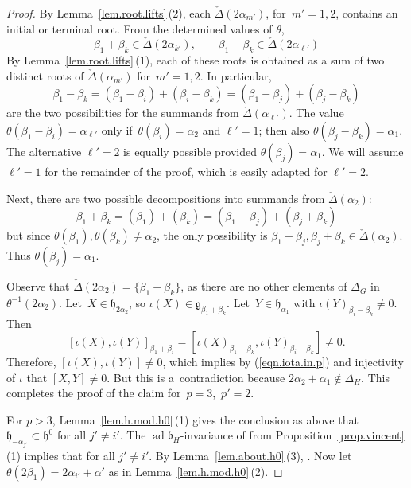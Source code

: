 \documentclass[pdftex]{sigma}
\numberwithin{equation}{section}
\theoremstyle{definition}
\newcommand{\lieg}{\mathfrak{g}}
\newcommand{\lieh}{\mathfrak{h}}
\def\b{{\mathfrak b}}
\newcommand{\ad}{\operatorname{ad}}
\begin{document}
\begin{proof}
By Lemma~\ref{lem.root.lifts}\,(2), each $\check{\Delta}(2 \alpha_{m'})$, for~${m'=1,2}$, contains an initial or terminal root. From the determined values of $\theta$,
\[ \beta_1 + \beta_k \in \check{\Delta}(2 \alpha_{k'}), \qquad \beta_1 - \beta_k \in \check{\Delta}(2 \alpha_{\ell'}) \]
By Lemma~\ref{lem.root.lifts}\,(1), each of these roots is obtained as a sum of two distinct roots of $\check{\Delta}(\alpha_{m'})$ for~${m'=1,2}$. In particular,
\[\beta_1 - \beta_k = (\beta_1 - \beta_i) + (\beta_i - \beta_k) = (\beta_1 - \beta_j) + (\beta_j - \beta_k)\]
are the two possibilities for the summands from $\check{\Delta}(\alpha_{\ell'})$. The value $\theta(\beta_1 - \beta_i) = \alpha_{\ell'}$
only if~${\theta(\beta_i) = \alpha_2}$ and $\ell'=1$;
then also $\theta(\beta_j- \beta_k) = \alpha_1$. The alternative $\ell'=2$ is equally possible provided $\theta(\beta_j) = \alpha_1$. We will assume $\ell'=1$ for the remainder of the proof, which is easily adapted for $\ell'=2$.

Next, there are two possible decompositions into summands from $\check{\Delta}(\alpha_{2})$:
\[ \beta_1 + \beta_k = (\beta_1) + (\beta_k) = (\beta_1 - \beta_j) + (\beta_j + \beta_k)\]
but since $\theta(\beta_1), \theta(\beta_k) \neq \alpha_2$, the only possibility is $\beta_1 - \beta_j, \beta_j + \beta_k \in \check{\Delta}(\alpha_2)$. Thus $\theta(\beta_j) = \alpha_1$.

Observe that $\check{\Delta}(2 \alpha_2) = \{ \beta_1 + \beta_k \}$, as there are no other elements of $\Delta_G^+$ in $\theta^{-1}(2 \alpha_2)$. Let~${X \in \lieh_{2 \alpha_2}}$, so $\iota(X) \in \lieg_{\beta_1 + \beta_k}$. Let~${Y \in \lieh_{\alpha_1}}$ with $\iota(Y)_{\beta_i - \beta_k} \neq 0$. Then
\[[\iota(X), \iota(Y)]_{\beta_1 + \beta_i} = [\iota(X)_{\beta_1 + \beta_k} , \iota(Y)_{\beta_i - \beta_k}] \neq 0.\]
Therefore, $[\iota(X), \iota(Y)] \neq 0$, which implies by (\ref{eqn.iota.in.p}) and injectivity of $\iota$ that $[X,Y] \neq 0$. But this is a~contradiction because $2 \alpha_2 + \alpha_1 \notin \Delta_H$. This completes the proof of the claim for~${p=3}$,~${p'=2}$.

For $p > 3$, Lemma~\ref{lem.h.mod.h0}\,(1) gives the conclusion as above that $\lieh_{- \alpha_{j'}} \subset \lieh^0$ for all $j'\neq i'$. The $\ad \b_H$-invariance of \smash{$\lieh^0$} from Proposition~\ref{prop.vincent}\,(1) implies that \smash{$\lieh_{ \alpha_{j'}} \subset \lieh^0$} for all $j' \neq i'$. By Lemma~\ref{lem.about.h0}\,(3), \smash{$\lieh_{- \alpha_{i'}} \cap \lieh^0 = 0$}.
Now
let $\theta(2 \beta_1) = 2 \alpha_{i'} + \alpha'$
as in Lemma~\ref{lem.h.mod.h0}\,(2).


\end{proof}
\end{document}
